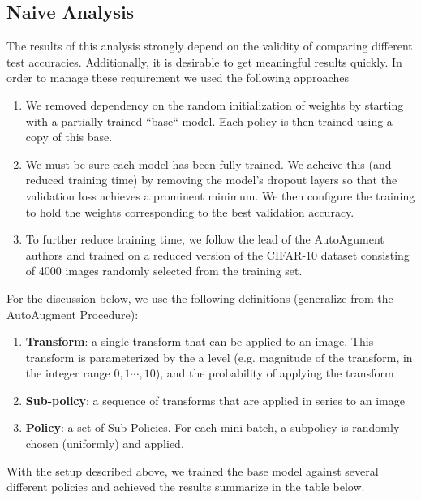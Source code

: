 \documentclass[10pt,twocolumn,letterpaper]{article}
\begin{document}
	
	\subsection{Naive Analysis}
		
		The results of this analysis strongly depend on the validity of comparing different test accuracies. Additionally, it is desirable to get meaningful results quickly. In order to manage these requirement we used the following approaches
		
		\begin{enumerate}
			\item
				We removed dependency on the random initialization of weights by starting with a partially trained ``base`` model. Each policy is then trained using a copy of this base.
				
			\item 
				We must be sure each model has been fully trained. We acheive this (and reduced training time) by removing the model's dropout layers so that the validation loss achieves a prominent minimum. We then configure the training to hold the weights corresponding to the best validation accuracy.
				
			\item 
				To further reduce training time, we follow the lead of the AutoAgument authors and trained on a reduced version of the CIFAR-10 dataset consisting of 4000 images randomly selected from the training set.
		\end{enumerate}

		
		
		For the discussion below, we use the following definitions (generalize from the AutoAugment Procedure):
		\begin{enumerate}
			\item[] 
				\textbf{Transform}: a single transform that can be applied to an image. This transform is parameterized by the a level (e.g. magnitude of the transform, in the integer range $0,1 \cdots, 10$), and the probability of applying the transform
				
			\item[] 
				\textbf{Sub-policy}: a sequence of transforms that are applied in series to an image
			
			\item[] 
				\textbf{Policy}: a set of Sub-Policies. For each mini-batch, a subpolicy is randomly chosen (uniformly) and applied.
		\end{enumerate}
		
		With the setup described above, we trained the base model against several different policies and achieved the results summarize in the table below.
		
\end{document}
